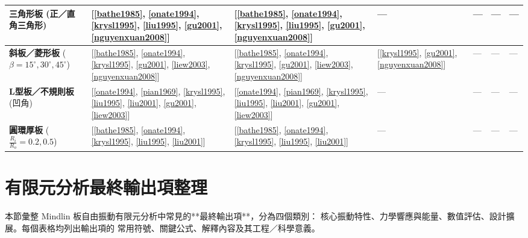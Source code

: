 \documentclass[a4paper,10pt]{article}
\begin{document}
\begin{landscape}
\begin{tabular}{lp{2.8cm}p{2.8cm}p{2.6cm}p{2.4cm}p{2.4cm}p{2.4cm}}
\midrule
\textbf{三角形板} (正／直角三角形) &
  [\ref{bathe1985}, \ref{onate1994}, \ref{krysl1995}, \ref{liu1995}, \ref{gu2001}, \ref{nguyenxuan2008}] &
  [\ref{bathe1985}, \ref{onate1994}, \ref{krysl1995}, \ref{liu1995}, \ref{gu2001}, \ref{nguyenxuan2008}] &
  --- &
  --- &
  --- &
  --- \\
\midrule
\textbf{斜板／菱形板} ($\beta=15^{\circ},30^{\circ},45^{\circ}$) &
  [\ref{bathe1985}, \ref{onate1994}, \ref{krysl1995}, \ref{gu2001}, \ref{liew2003}, \ref{nguyenxuan2008}] &
  [\ref{bathe1985}, \ref{onate1994}, \ref{krysl1995}, \ref{gu2001}, \ref{liew2003}, \ref{nguyenxuan2008}] &
  [\ref{krysl1995}, \ref{gu2001}, \ref{nguyenxuan2008}] &
  --- &
  --- &
  --- \\
\midrule
\textbf{L型板／不規則板} (凹角) &
  [\ref{onate1994}, \ref{pian1969}, \ref{krysl1995}, \ref{liu1995}, \ref{liu2001}, \ref{gu2001}, \ref{liew2003}] &
  [\ref{onate1994}, \ref{pian1969}, \ref{krysl1995}, \ref{liu1995}, \ref{liu2001}, \ref{gu2001}, \ref{liew2003}] &
  --- &
  --- &
  --- &
  --- \\
\midrule
\textbf{圓環厚板} ($\frac{R_i}{R_o}=0.2,0.5$) &
  [\ref{bathe1985}, \ref{onate1994}, \ref{krysl1995}, \ref{liu1995}, \ref{liu2001}] &
  [\ref{bathe1985}, \ref{onate1994}, \ref{krysl1995}, \ref{liu1995}, \ref{liu2001}] &
  --- &
  --- &
  --- &
  --- \\
\bottomrule
\end{tabular}
\end{landscape}
\clearpage

\section{有限元分析最終輸出項整理}
\label{sec:outputs}

本節彙整 Mindlin 板自由振動有限元分析中常見的**最終輸出項**，分為四個類別：
核心振動特性、力學響應與能量、數值評估、設計擴展。每個表格均列出輸出項的
常用符號、關鍵公式、解釋內容及其工程／科學意義。
\end{document}
